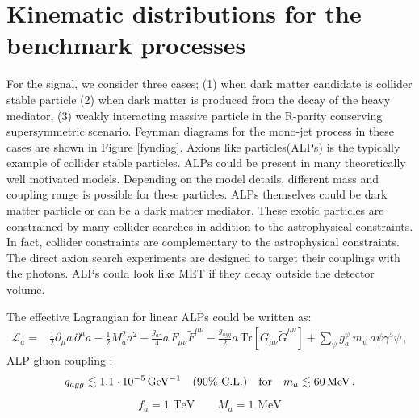 \documentclass[aps,onecolumn,showpacs,superscriptaddress,groupedaddress,nofootinbib,preprint]{revtex4-1}
\newcommand{\cl}{\%\,\,  \text{C.L.}}
\begin{document}
\section{Kinematic distributions for the benchmark processes}
For the signal, we consider three cases; (1) when dark matter candidate is collider stable particle (2) when dark
matter is produced from the decay of the heavy mediator, (3) weakly interacting massive particle in the R-parity conserving supersymmetric
scenario. Feynman diagrams for the mono-jet process in these cases are shown in Figure \ref{fyndiag}.
Axions like particles(ALPs) is the 
typically example of collider stable particles. ALPs could be present in many theoretically well motivated models. Depending on 
the model details, different mass and coupling range is possible for these particles. ALPs themselves could be dark matter particle\cite{} or
 can be a dark matter mediator. These exotic particles are constrained by many collider searches in addition to 
 the astrophysical constraints. In fact, collider constraints are complementary to the astrophysical constraints\cite{}. The direct 
 axion search experiments are designed to target their couplings with the photons. ALPs could look like MET if they decay outside the detector volume.
 
The effective Lagrangian for linear ALPs could be written as:
\begin{align}\label{eqn:L_eff}
    \mathcal{L}_a = &\frac{1}{2}\partial_{\mu}a\,\partial^{\mu}a  - \frac{1}{2}M_{a}^2 a^2
                  -\frac{g_{a\gamma}}{4}a\,F_{\mu\nu}\tilde{F}^{\mu\nu} \nonumber 
                   - \frac{g_{agg}}{2}a\,\text{Tr}\left[G_{\mu\nu}\tilde{G}^{\mu\nu}\right] 
                  +\sum_{\psi}g^{\psi}_{a} \,m_\psi\,a\bar \psi \gamma^5 \psi\,,
\end{align}
ALP-gluon coupling \cite{Mimasu:2014nea,Brivio:2017ije} :
\[
g_{agg} \lesssim \unit[1.1\cdot10^{-5}]{GeV^{-1}} \quad (90\cl) \quad \text{for}\quad m_a \lesssim \unit[60]{MeV}\,.
\]

\[ f_a=1\,\, \mbox{TeV} \quad \quad  M_{a}=1\,\, \mbox{MeV}  \]
\end{document}
